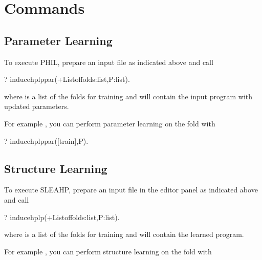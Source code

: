 \documentclass[letterpaper,10pt,english]{sphinxmanual}
\begin{document}
\section{Commands}
\label{\detokenize{index:commands}}

\subsection{Parameter Learning}
\label{\detokenize{index:parameter-learning}}
To execute PHIL, prepare an input file as indicated above and call

%
\begin{sphinxVerbatim}[commandchars=\\\{\}]
?\PYGZhy{} induce\PYGZus{}hplp\PYGZus{}par(+List\PYGZus{}of\PYGZus{}folds:list,\PYGZhy{}P:list).
\end{sphinxVerbatim}

where  is a list of the folds for training and  will contain the input program with updated parameters.

For example , you can perform parameter learning on the  fold with

%
\begin{sphinxVerbatim}[commandchars=\\\{\}]
?\PYGZhy{} induce\PYGZus{}hplp\PYGZus{}par([train],P).
\end{sphinxVerbatim}


\subsection{Structure Learning}
\label{\detokenize{index:structure-learning}}
To execute SLEAHP, prepare an input file in the editor panel as indicated above and call

%
\begin{sphinxVerbatim}[commandchars=\\\{\}]
?\PYGZhy{} induce\PYGZus{}hplp(+List\PYGZus{}of\PYGZus{}folds:list,\PYGZhy{}P:list).
\end{sphinxVerbatim}

where  is a list of the folds for training and  will contain the learned program.

For example , you can perform structure learning on the  fold with
\end{document}
